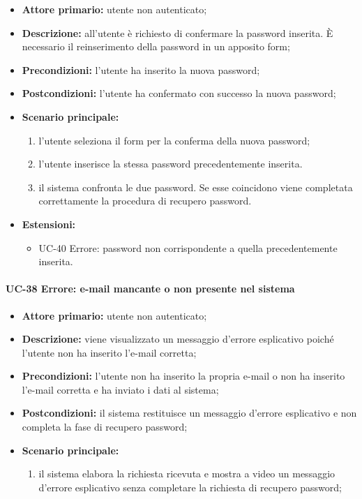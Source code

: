 	\begin{itemize}
		\item \textbf{Attore primario:} utente non autenticato;

		\item \textbf{Descrizione:} all'utente è richiesto di confermare la password inserita. \`{E} necessario il reinserimento della password in un apposito form;

		\item \textbf{Precondizioni:} l'utente ha inserito la nuova password;

		\item \textbf{Postcondizioni:} l'utente ha confermato con successo la nuova password;

		\item \textbf{Scenario principale:}
	  		\begin{enumerate}
		  		\item l'utente seleziona il form per la conferma della nuova password;
		  		\item l'utente inserisce la stessa password precedentemente inserita.
		  		\item il sistema confronta le due password. Se esse coincidono viene completata correttamente la procedura di recupero password.
	  		\end{enumerate}
	  	\item \textbf{Estensioni:}
	  		\begin{itemize}
		  		\item UC-40 Errore: password non corrispondente a quella precedentemente inserita.
	  		\end{itemize}
	\end{itemize}

\paragraph{UC-38 Errore: e-mail mancante o non presente nel sistema}

	\begin{itemize}
		\item \textbf{Attore primario:} utente non autenticato;

		\item \textbf{Descrizione:} viene visualizzato un messaggio d'errore esplicativo poiché l'utente non ha inserito l'e-mail corretta;

		\item \textbf{Precondizioni:} l'utente non ha inserito la propria e-mail o non ha inserito l'e-mail corretta e ha inviato i dati al sistema;

		\item \textbf{Postcondizioni:} il sistema restituisce un messaggio d'errore esplicativo e non completa la fase di recupero password;

		\item \textbf{Scenario principale:}
	  		\begin{enumerate}
		  		\item il sistema elabora la richiesta ricevuta e mostra a video un messaggio d'errore esplicativo senza completare la richiesta di recupero password; 
	  		\end{enumerate}
	\end{itemize}


